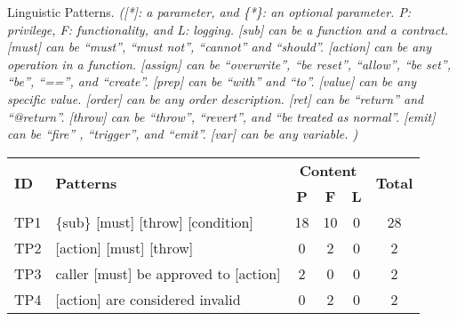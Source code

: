 \begin{table}[t]
    \centering
    \small
    \setlength{\tabcolsep}{3pt} 
    {Linguistic Patterns.}
    {\textit{([*]: a parameter, and \{*\}: an optional parameter.
    P: privilege, F: functionality, and L: logging. 
    [sub] can be a function and a contract.
    [must] can be ``must'', ``must not'', ``cannot'' and ``should''.
    [action] can be any operation in a function.
    [assign] can be ``overwrite'', ``be reset'', ``allow'', ``be set'', ``be'', ``=='', and ``create''. 
    [prep] can be ``with'' and ``to''.
    [value] can be any specific value.
    [order] can be any order description.
    [ret] can be ``return'' and ``@return''.
    [throw] can be ``throw'', ``revert'', and ``be treated as normal''.
    [emit] can be ``fire'' , ``trigger'', and ``emit''.
    [var] can be any variable.
    )}
    }
    \begin{tabular}{|l|p{}|c|c|c|c|}
    \hline
\multirow{2}{*}{{\textbf{ID}}} & \multirow{2}{*}{\textbf{Patterns}} & \multicolumn{3}{c|}{\textbf{Content}} & \multirow{2}{*}{{\textbf{Total}}}       \\ \cline{3-5}
 &  & {{\textbf{P}}} & {{\textbf{F}}} &  {{\textbf{L}}} &  \\ \hline \hline
    
    TP1 & \{sub\} [must] [throw] [condition]             & 18  & 10   & 0  & 28        \\ \hline
    TP2 & [action] [must] [throw]                        & 0   & 2  &  0 & 2         \\ \hline
    TP3 & caller [must] be approved to [action]               & 2   &0    &  0   &  2       \\ \hline
    TP4 & [action] are considered invalid                    &  0  & 2 &   0  &   2      \\ \hline


\end{tabular}
\end{table}
